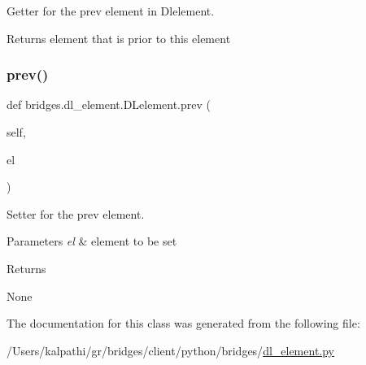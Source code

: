 Getter for the prev element in Dlelement. 

\begin{DoxyReturn}{Returns}
element that is prior to this element 
\end{DoxyReturn}
\mbox{\label{classbridges_1_1dl__element_1_1_d_lelement_a17c371ec0c38e9555e55551d9be4d185}} 
\subsubsection{\texorpdfstring{prev()}{prev()}\hspace{0.1cm}{\footnotesize\ttfamily [2/2]}}
{\footnotesize\ttfamily def bridges.\+dl\+\_\+element.\+D\+Lelement.\+prev (\begin{DoxyParamCaption}\item[{}]{self,  }\item[{}]{el }\end{DoxyParamCaption})}



Setter for the prev element. 


\begin{DoxyParams}{Parameters}
{\em el} & element to be set\\
\hline
\end{DoxyParams}
\begin{DoxyReturn}{Returns}


None 
\end{DoxyReturn}


The documentation for this class was generated from the following file\+:\begin{DoxyCompactItemize}
\item 
/\+Users/kalpathi/gr/bridges/client/python/bridges/\mbox{\hyperlink{dl__element_8py}{dl\+\_\+element.\+py}}\end{DoxyCompactItemize}
